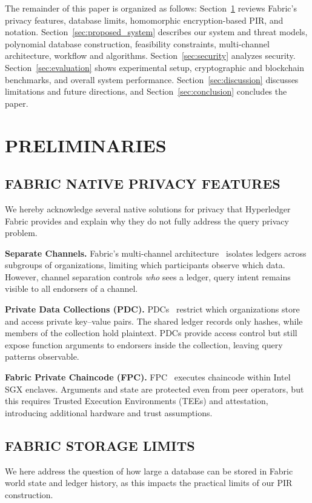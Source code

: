 \documentclass{ieeetj}
\begin{document}
The remainder of this paper is organized as follows: 
Section~\ref{sec:preliminaries} reviews Fabric's privacy features, database limits, homomorphic encryption-based PIR, and notation.
Section~\ref{sec:proposed_system} describes our system and threat models, polynomial database construction, feasibility constraints, 
multi-channel architecture, workflow and algorithms.
Section~\ref{sec:security} analyzes security.
Section~\ref{sec:evaluation} shows experimental setup, cryptographic and blockchain benchmarks, and overall system performance.
Section~\ref{sec:discussion} discusses limitations and future directions, and Section~\ref{sec:conclusion} concludes the paper.

\section{PRELIMINARIES}\label{sec:preliminaries}

\subsection{FABRIC NATIVE PRIVACY FEATURES}
We hereby acknowledge several native solutions for privacy that Hyperledger Fabric provides and explain why they do not fully address the 
query privacy problem.

\textbf{Separate Channels.} Fabric's multi-channel architecture~\cite{fabric_docs_a_nodate} isolates ledgers across subgroups of organizations, 
limiting which participants observe which data. 
However, channel separation controls \emph{who} sees a ledger, query intent remains visible to all endorsers of a channel.

\textbf{Private Data Collections (PDC).} PDCs~\cite{fabric_docs_a_nodate} restrict which organizations store and access private key–value pairs. 
The shared ledger records only hashes, while members of the collection hold plaintext. 
PDCs provide access control but still expose function arguments to endorsers inside the collection, leaving query patterns observable.

\textbf{Fabric Private Chaincode (FPC).} FPC~\cite{fabric_docs_a_nodate, brandenburger_blockchain_2018} executes chaincode within Intel SGX enclaves. 
Arguments and state are protected even from peer operators, but this requires Trusted Execution Environments (TEEs) and attestation, 
introducing additional hardware and trust assumptions.

\subsection{FABRIC STORAGE LIMITS}
We here address the question of how large a database can be stored in Fabric world state and ledger history, as this impacts the 
practical limits of our PIR construction.
\end{document}
